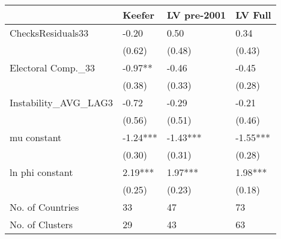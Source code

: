\begin{tabular}{llll}
  \hline
 & Keefer & LV pre-2001 & LV Full \\ 
  \hline
ChecksResiduals33 & -0.20 & 0.50 & 0.34 \\ 
   & (0.62) & (0.48) & (0.43) \\ 
  Electoral Comp.\_33 & -0.97** & -0.46 & -0.45 \\ 
   & (0.38) & (0.33) & (0.28) \\ 
  Instability\_AVG\_LAG3 & -0.72 & -0.29 & -0.21 \\ 
   & (0.56) & (0.51) & (0.46) \\ 
  mu constant & -1.24*** & -1.43*** & -1.55*** \\ 
   & (0.30) & (0.31) & (0.28) \\ 
  ln phi constant & 2.19*** & 1.97*** & 1.98*** \\ 
   & (0.25) & (0.23) & (0.18) \\ 
  No. of Countries & 33 & 47 & 73 \\ 
  No. of Clusters & 29 & 43 & 63 \\ 
   \hline
\end{tabular}
